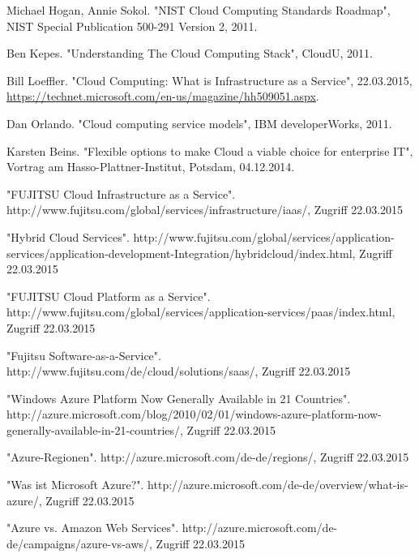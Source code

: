 \ifCLASSOPTIONcaptionsoff
  \newpage
\fi


\begin{thebibliography}{1}

Michael Hogan, Annie Sokol. "NIST Cloud Computing Standards Roadmap", NIST Special Publication 500-291 Version 2, 2011.

Ben Kepes. "Understanding The Cloud Computing Stack", CloudU, 2011.

Bill Loeffler. "Cloud Computing: What is Infrastructure as a Service", 22.03.2015, \url{https://technet.microsoft.com/en-us/magazine/hh509051.aspx}.

Dan Orlando. "Cloud computing service models", IBM developerWorks, 2011.

Karsten Beins. "Flexible options to make Cloud a viable choice for enterprise IT", Vortrag am Hasso-Plattner-Institut, Potsdam, 04.12.2014.

"FUJITSU Cloud Infrastructure as a Service". http://www.fujitsu.com/global/services/infrastructure/iaas/, Zugriff 22.03.2015

"Hybrid Cloud Services". http://www.fujitsu.com/global/services/application-services/application-development-Integration/hybridcloud/index.html, Zugriff 22.03.2015

"FUJITSU Cloud Platform as a Service". http://www.fujitsu.com/global/services/application-services/paas/index.html, Zugriff 22.03.2015

"Fujitsu Software-as-a-Service". http://www.fujitsu.com/de/cloud/solutions/saas/, Zugriff 22.03.2015

"Windows Azure Platform Now Generally Available in 21 Countries". http://azure.microsoft.com/blog/2010/02/01/windows-azure-platform-now-generally-available-in-21-countries/, Zugriff 22.03.2015

"Azure-Regionen". http://azure.microsoft.com/de-de/regions/, Zugriff 22.03.2015

"Was ist Microsoft Azure?". http://azure.microsoft.com/de-de/overview/what-is-azure/, Zugriff 22.03.2015

"Azure vs. Amazon Web Services". http://azure.microsoft.com/de-de/campaigns/azure-vs-aws/, Zugriff 22.03.2015


\end{thebibliography}
